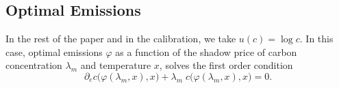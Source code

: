 \documentclass[../../main.tex]{subfiles}
\begin{document}
    \subsection{Optimal Emissions}

    In the rest of the paper and in the calibration, we take $u(c) = \log c$. In this case, optimal emissions $\varphi$ as a function of the shadow price of carbon concentration $\lambda_m$ and temperature $x$, solves the first order condition \begin{equation}
        \partial_e c \Big(\varphi(\lambda_m, x), x\Big) + \lambda_m \; c\Big(\varphi(\lambda_m, x), x\Big) = 0.
    \end{equation}
\fi
\end{document}
